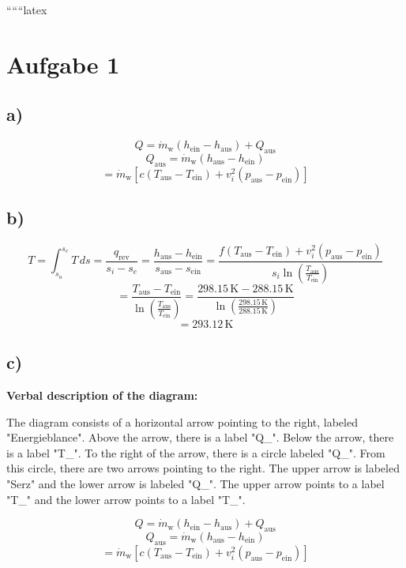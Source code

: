 
``````latex


\section*{Aufgabe 1}

\subsection*{a)}
\[
Q = \dot{m}_{\text{w}} (h_{\text{ein}} - h_{\text{aus}}) + Q_{\text{aus}}
\]
\[
Q_{\text{aus}} = \dot{m}_{\text{w}} (h_{\text{aus}} - h_{\text{ein}})
\]
\[
= \dot{m}_{\text{w}} \left[ c (T_{\text{aus}} - T_{\text{ein}}) + v_i^2 (p_{\text{aus}} - p_{\text{ein}}) \right]
\]

\subsection*{b)}
\[
T = \int_{s_a}^{s_e} T \, ds = \frac{q_{\text{rev}}}{s_i - s_e} = \frac{h_{\text{aus}} - h_{\text{ein}}}{s_{\text{aus}} - s_{\text{ein}}} = \frac{f (T_{\text{aus}} - T_{\text{ein}}) + v_i^2 (p_{\text{aus}} - p_{\text{ein}})}{s_i \ln \left( \frac{T_{\text{aus}}}{T_{\text{ein}}} \right)}
\]
\[
= \frac{T_{\text{aus}} - T_{\text{ein}}}{\ln \left( \frac{T_{\text{aus}}}{T_{\text{ein}}} \right)} = \frac{298.15 \, \text{K} - 288.15 \, \text{K}}{\ln \left( \frac{298.15 \, \text{K}}{288.15 \, \text{K}} \right)}
\]
\[
= 293.12 \, \text{K}
\]

\subsection*{c)}
\textbf{Verbal description of the diagram:}

The diagram consists of a horizontal arrow pointing to the right, labeled "Energieblance". Above the arrow, there is a label "Q_{}". Below the arrow, there is a label "T_{}". To the right of the arrow, there is a circle labeled "Q_{}". From this circle, there are two arrows pointing to the right. The upper arrow is labeled "Serz" and the lower arrow is labeled "Q_{}". The upper arrow points to a label "T_{}" and the lower arrow points to a label "T_{}".

\[
Q = \dot{m}_{\text{w}} (h_{\text{ein}} - h_{\text{aus}}) + Q_{\text{aus}}
\]
\[
Q_{\text{aus}} = \dot{m}_{\text{w}} (h_{\text{aus}} - h_{\text{ein}})
\]
\[
= \dot{m}_{\text{w}} \left[ c (T_{\text{aus}} - T_{\text{ein}}) + v_i^2 (p_{\text{aus}} - p_{\text{ein}}) \right]
\]

